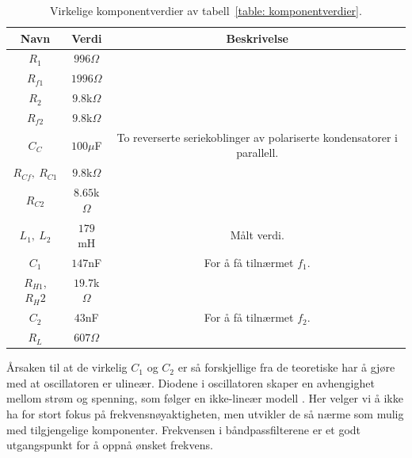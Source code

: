 \documentclass[a4paper,11pt,norsk]{article}
\begin{document}
\begin{table}[!htbp]
    \centering
    \begin{tabular}{|c|c|c|}
    \hline
    \textbf{Navn} & \textbf{Verdi} & \textbf{Beskrivelse} \\
    \hline
    $R_1$ & $996\Omega$ & \\
    \hline
    $R_{f1}$ & $1996\Omega$ & \\
    \hline
    $R_2$ & $9.8$k$\Omega$ & \\
    \hline
    $R_{f2}$ & $9.8$k$\Omega$ & \\
    \hline
    $C_{C}$ & $100\mu$F & To reverserte seriekoblinger av polariserte kondensatorer i parallell. \\
    \hline
    $R_{Cf}, \: R_{C1}$ & $9.8$k$\Omega$ &  \\
    \hline
    $R_{C2}$ & $8.65$k$\Omega$ &  \\
    \hline
    $L_1, \: L_2$ & $179$mH & Målt verdi.\\
    \hline
    $C_1$ & $147$nF & For å få tilnærmet $f_1$.  \\
    \hline
    $R_{H1}$, $R_H{2}$ & $19.7$k$\Omega$ & \\
    \hline
    $C_2$ & $43$nF & For å få tilnærmet $f_2$. \\
    \hline
    $R_L$ & $607\Omega$ & \\
    \hline
    \end{tabular}
    \caption{Virkelige komponentverdier av tabell~\ref{table: komponentverdier}.}
    \label{table: Virkelige komponenter}
\end{table} 
\newpage
Årsaken til at de virkelig $C_1$ og $C_2$ er så forskjellige fra de teoretiske har å gjøre med at oscillatoren er ulineær. Diodene i oscillatoren skaper en avhengighet mellom strøm og spenning, som følger en ikke-lineær modell \cite{U-oscillator}. Her velger vi å ikke ha for stort fokus på frekvensnøyaktigheten, men utvikler de så nærme som mulig med tilgjengelige komponenter. Frekvensen i båndpassfilterene er et godt utgangspunkt for å oppnå ønsket frekvens. 
\end{document}
